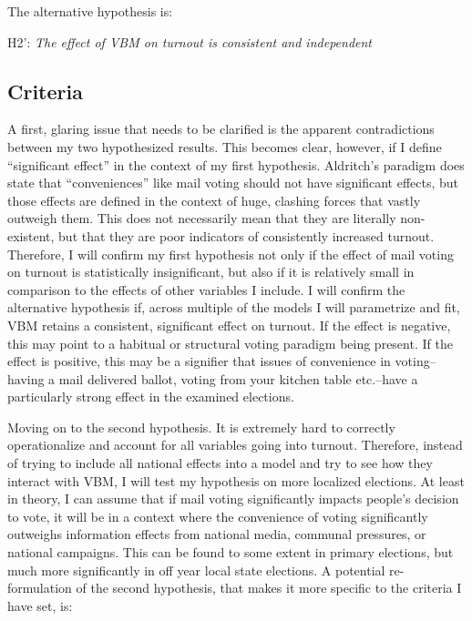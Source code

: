 \documentclass[12pt,twoside]{reedthesis}
\begin{document}
  The alternative hypothesis is:
  
  \begin{center}  
  H2': \textit{The  effect  of  VBM  on  turnout  is  consistent  and  independent}
  \end{center}
  
  \subsection{Criteria}\label{criteria}
  
  A first, glaring issue that needs to be clarified is the apparent
  contradictions between my two hypothesized results. This becomes clear,
  however, if I define ``significant effect'' in the context of my first
  hypothesis. Aldritch's paradigm does state that ``conveniences'' like
  mail voting should not have significant effects, but those effects are
  defined in the context of huge, clashing forces that vastly outweigh
  them. This does not necessarily mean that they are literally
  non-existent, but that they are poor indicators of consistently
  increased turnout. Therefore, I will confirm my first hypothesis not
  only if the effect of mail voting on turnout is statistically
  insignificant, but also if it is relatively small in comparison to the
  effects of other variables I include. I will confirm the alternative
  hypothesis if, across multiple of the models I will parametrize and fit,
  VBM retains a consistent, significant effect on turnout. If the effect
  is negative, this may point to a habitual or structural voting paradigm
  being present. If the effect is positive, this may be a signifier that
  issues of convenience in voting--having a mail delivered ballot, voting
  from your kitchen table etc.--have a particularly strong effect in the
  examined elections.
  
  Moving on to the second hypothesis. It is extremely hard to correctly
  operationalize and account for all variables going into turnout.
  Therefore, instead of trying to include all national effects into a
  model and try to see how they interact with VBM, I will test my
  hypothesis on more localized elections. At least in theory, I can assume
  that if mail voting significantly impacts people's decision to vote, it
  will be in a context where the convenience of voting significantly
  outweighs information effects from national media, communal pressures,
  or national campaigns. This can be found to some extent in primary
  elections, but much more significantly in off year local state
  elections. A potential re-formulation of the second hypothesis, that
  makes it more specific to the criteria I have set, is:
  
\end{document}
